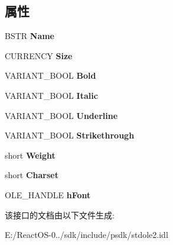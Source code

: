 \subsection*{属性}
\begin{DoxyCompactItemize}
\item 
\mbox{\label{interfacestdole_1_1_i_font_a2bc24ac0c640224b59df05fc2b169f82}} 
B\+S\+TR {\bfseries Name}
\item 
\mbox{\label{interfacestdole_1_1_i_font_a72b8728a14ebdfb5fd6ea616f181a5d4}} 
C\+U\+R\+R\+E\+N\+CY {\bfseries Size}
\item 
\mbox{\label{interfacestdole_1_1_i_font_acadee1494aa3b12dd289e5204d62043a}} 
V\+A\+R\+I\+A\+N\+T\+\_\+\+B\+O\+OL {\bfseries Bold}
\item 
\mbox{\label{interfacestdole_1_1_i_font_a32cd8cb6737077ee292851c5acde7d96}} 
V\+A\+R\+I\+A\+N\+T\+\_\+\+B\+O\+OL {\bfseries Italic}
\item 
\mbox{\label{interfacestdole_1_1_i_font_aaddc866311185dde6d2321fd31bd0088}} 
V\+A\+R\+I\+A\+N\+T\+\_\+\+B\+O\+OL {\bfseries Underline}
\item 
\mbox{\label{interfacestdole_1_1_i_font_ae6a8e88d9ed18751500f22e49e32b7c9}} 
V\+A\+R\+I\+A\+N\+T\+\_\+\+B\+O\+OL {\bfseries Strikethrough}
\item 
\mbox{\label{interfacestdole_1_1_i_font_a15ba6d0f2b42d20fff80fd16b3abede6}} 
short {\bfseries Weight}
\item 
\mbox{\label{interfacestdole_1_1_i_font_a7e5ee8917217419cc0040b42922285ba}} 
short {\bfseries Charset}
\item 
\mbox{\label{interfacestdole_1_1_i_font_a38a9fa692d781565e3f60c2eaf63fb95}} 
O\+L\+E\+\_\+\+H\+A\+N\+D\+LE {\bfseries h\+Font}
\end{DoxyCompactItemize}


该接口的文档由以下文件生成\+:\begin{DoxyCompactItemize}
\item 
E\+:/\+React\+O\+S-\/0../sdk/include/psdk/stdole2.\+idl\end{DoxyCompactItemize}
